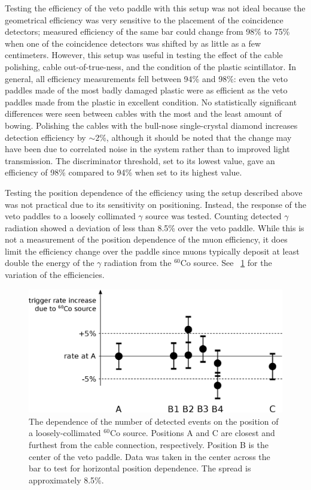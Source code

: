 Testing the efficiency of the veto paddle with this setup was not ideal because the geometrical efficiency was very sensitive to the placement of the coincidence detectors; measured efficiency of the same bar could change from 98\% to 75\% when one of the coincidence detectors was shifted by as little as a few centimeters.  However, this setup was useful in testing the effect of the cable polishing, cable out-of-true-ness, and the condition of the plastic scintillator.  In general, all efficiency measurements fell between 94\% and 98\%: even the veto paddles made of the most badly damaged plastic were as efficient as the veto paddles made from the plastic in excellent condition.  No statistically significant differences were seen between cables with the most and the least amount of bowing.  Polishing the cables with the bull-nose single-crystal diamond increases detection efficiency by $\sim2$\%, although it should be noted that the change may have been due to correlated noise in the system rather than to improved light transmission.  The discriminator threshold, set to its lowest value, gave an efficiency of 98\% compared to 94\% when set to its highest value.

Testing the position dependence of the efficiency using the setup described above was not practical due to its sensitivity on positioning.  Instead, the response of the veto paddles to a loosely collimated $\gamma$ source was tested.  Counting detected $\gamma$ radiation showed a deviation of less than 8.5\% over the veto paddle.  While this is not a measurement of the position dependence of the muon efficiency, it does limit the efficiency change over the paddle since muons typically deposit at least double the energy of the $\gamma$ radiation from the $^{60}$Co source.  See {\fig}~\ref{fig:positionDependence} for the variation of the efficiencies.
\begin{figure}[htp]
\centering
\includegraphics[width=1.0\textwidth]{figures/efficiency_positionDependence.eps}
\caption{The dependence of the number of detected events on the position of a loosely-collimated $^{60}$Co source.  Positions A and C are closest and furthest from the cable connection, respectively.  Position B is the center of the veto paddle.  Data was taken in the center across the bar to test for horizontal position dependence.  The spread is approximately 8.5\%.}
\label{fig:positionDependence}
\end{figure}


